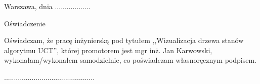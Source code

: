 \documentclass[a4paper,11pt,twoside]{report}
\theoremstyle{definition}
\newcommand{\tytul}{Wizualizacja drzewa stanów algorytmu UCT}
\newcommand{\tytulen}{Visualization of UCT trees}
\newcommand{\type}{inżyniers}
\newcommand{\supervisor}{mgr inż. Jan Karwowski}
\begin{document}
\null\thispagestyle{empty}\newpage

{
\begin{abstract}

\begin{center}
\tytulen
\end{center}

The topic of this engineering diploma project is the implementation...

\noindent \textbf{Keywords:} UCT, visualisation
\end{abstract}
}




\null\thispagestyle{empty}\newpage

\null \hfill Warszawa, dnia ..................\\

\par\vspace{5cm}

\begin{center}
Oświadczenie
\end{center}

\indent Oświadczam, że pracę \type ką pod tytułem ,,\tytul '', której promotorem jest \supervisor , wykonałam/wykonałem samodzielnie, co poświadczam własnoręcznym podpisem.
\vspace{2cm}


\begin{flushright}
  \begin{minipage}{50mm}
    \begin{center}
      ..............................................

    \end{center}
  \end{minipage}
\end{flushright}

\thispagestyle{empty}
\newpage

\null\thispagestyle{empty}\newpage


\tableofcontents
\thispagestyle{empty}

\newpage %

\null\thispagestyle{empty}\newpage
\pagestyle{fancy}
\setcounter{page}{11} %
\end{document}

